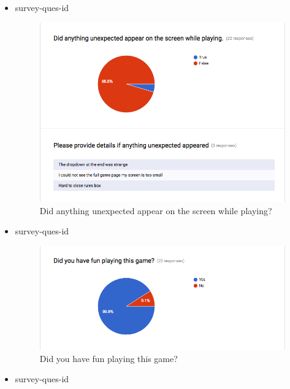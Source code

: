 \documentclass[12pt, titlepage]{article}
\newcounter{USnum}
\newcommand{\ttheUSnum}{survey-ques-id \theUSnum}
\begin{document}
\begin{itemize}
\item {\ttheUSnum \label{USq9}\\}

\begin{figure}[H]
\centering
\includegraphics[width=0.9\linewidth]{../../ReferenceMaterial/Survey_Results/Survey_Question_11}
\caption{Did anything unexpected appear on the screen while playing?}
\end{figure}

\item {\ttheUSnum \label{USq10}\\}

\begin{figure}[H]
\centering
\includegraphics[width=0.9\linewidth]{../../ReferenceMaterial/Survey_Results/Survey_Question_12}
\caption{Did you have fun playing this game? }
\end{figure}

\item {\ttheUSnum \label{USq11}\\}


\end{itemize}
\end{document}

